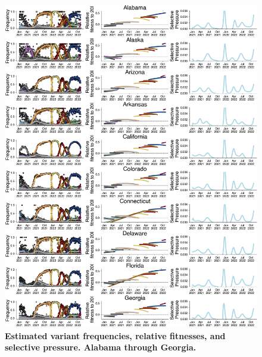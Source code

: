 \documentclass[11pt,oneside,letterpaper]{article}
\def\tbc#1{\textcolor{purple}{[#1]}}
\begin{document}
\begin{figure}[t!]
    \centering
    \includegraphics[width=1.0\textwidth=0.01]{./supplementary_figures/selective-pressure-analysis_group_1.png}
    \caption{
      \textbf{Estimated variant frequencies, relative fitnesses, and selective pressure. Alabama through Georgia.}
    }
    \label{fig:selective_pressure_group_1}
\end{figure}
\end{document}
